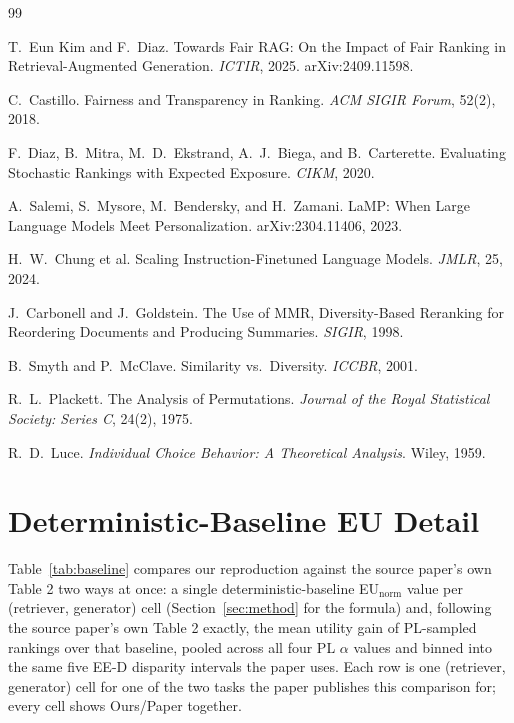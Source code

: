\documentclass[10pt,twocolumn]{article}
\begin{document}
{\footnotesize
\begin{thebibliography}{99}

T.\ Eun Kim and F.\ Diaz.
\newblock Towards Fair RAG: On the Impact of Fair Ranking in Retrieval-Augmented
Generation.
\newblock \emph{ICTIR}, 2025. arXiv:2409.11598.

C.\ Castillo.
\newblock Fairness and Transparency in Ranking.
\newblock \emph{ACM SIGIR Forum}, 52(2), 2018.

F.\ Diaz, B.\ Mitra, M.\ D.\ Ekstrand, A.\ J.\ Biega, and B.\ Carterette.
\newblock Evaluating Stochastic Rankings with Expected Exposure.
\newblock \emph{CIKM}, 2020.

A.\ Salemi, S.\ Mysore, M.\ Bendersky, and H.\ Zamani.
\newblock LaMP: When Large Language Models Meet Personalization.
\newblock arXiv:2304.11406, 2023.

H.\ W.\ Chung et al.
\newblock Scaling Instruction-Finetuned Language Models.
\newblock \emph{JMLR}, 25, 2024.

J.\ Carbonell and J.\ Goldstein.
\newblock The Use of MMR, Diversity-Based Reranking for Reordering Documents and
Producing Summaries.
\newblock \emph{SIGIR}, 1998.

B.\ Smyth and P.\ McClave.
\newblock Similarity vs.\ Diversity.
\newblock \emph{ICCBR}, 2001.

R.\ L.\ Plackett.
\newblock The Analysis of Permutations.
\newblock \emph{Journal of the Royal Statistical Society: Series C}, 24(2), 1975.

R.\ D.\ Luce.
\newblock \emph{Individual Choice Behavior: A Theoretical Analysis}.
\newblock Wiley, 1959.

\end{thebibliography}
}

\appendix
\section{Deterministic-Baseline EU Detail}
\label{app:baseline}

Table~\ref{tab:baseline} compares our reproduction against the source paper's own
Table 2 two ways at once: a single deterministic-baseline EU$_{\text{norm}}$ value
per (retriever, generator) cell (Section~\ref{sec:method} for the formula) and,
following the source paper's own Table 2 exactly, the mean utility gain of
PL-sampled rankings over that baseline, pooled across all four PL $\alpha$ values
and binned into the same five EE-D disparity intervals the paper uses. Each row is
one (retriever, generator) cell for one of the two tasks the paper publishes this
comparison for; every cell shows Ours/Paper together.
\end{document}
